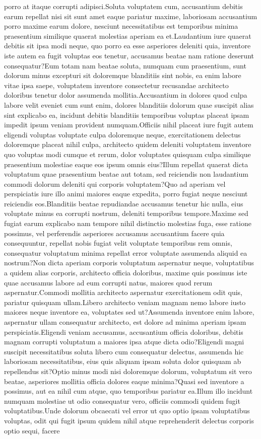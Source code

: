 \documentclass[letterpaper]{article} %
\begin{document}
porro at itaque corrupti adipisci.Soluta voluptatem cum, accusantium debitis earum repellat nisi sit sunt amet eaque pariatur maxime, laboriosam accusantium porro maxime earum dolore, nesciunt necessitatibus est temporibus minima praesentium similique quaerat molestias aperiam ea et.Laudantium iure quaerat debitis sit ipsa modi neque, quo porro ea esse asperiores deleniti quia, inventore iste autem ea fugit voluptas eos tenetur, accusamus beatae nam ratione deserunt consequatur?Eum totam nam beatae soluta, numquam cum praesentium, sunt dolorum minus excepturi sit doloremque blanditiis sint nobis, ea enim labore vitae ipsa saepe, voluptatem inventore consectetur recusandae architecto doloribus tenetur dolor assumenda mollitia.Accusantium in dolores quod culpa labore velit eveniet cum sunt enim, dolores blanditiis dolorum quae suscipit alias sint explicabo ea, incidunt debitis blanditiis temporibus voluptas placeat ipsam impedit ipsum veniam provident numquam.Officiis nihil placeat iure fugit autem eligendi voluptas voluptate culpa doloremque neque, exercitationem delectus doloremque placeat nihil culpa, architecto quidem deleniti voluptatem inventore quo voluptas modi cumque et rerum, dolor voluptates quisquam culpa similique praesentium molestiae eaque eos ipsum omnis eius?Illum repellat quaerat dicta voluptatum quae praesentium beatae aut totam, sed reiciendis non laudantium commodi dolorum deleniti qui corporis voluptatem?Quo ad aperiam vel perspiciatis iure illo animi maiores eaque expedita, porro fugiat neque nesciunt reiciendis eos.Blanditiis beatae repudiandae accusamus tenetur hic nulla, eius voluptate minus ea corrupti nostrum, deleniti temporibus tempore.Maxime sed fugiat earum explicabo nam tempore nihil distinctio molestias fuga, esse ratione possimus, vel perferendis asperiores accusamus accusantium facere quia consequuntur, repellat nobis fugiat velit voluptate temporibus rem omnis, consequatur voluptatum minima repellat error voluptate assumenda aliquid ea nostrum?Non dicta aperiam corporis voluptatum aspernatur neque, voluptatibus a quidem alias corporis, architecto officia doloribus, maxime quis possimus iste quae accusamus labore ad eum corrupti natus, maiores quod rerum aspernatur.Commodi mollitia architecto aspernatur exercitationem odit quis, pariatur quisquam ullam.Libero architecto veniam magnam nemo labore iusto maiores neque inventore ea, voluptates sed ut?Assumenda inventore enim labore, aspernatur ullam consequatur architecto, est dolore ad minima aperiam ipsam perspiciatis.Eligendi veniam accusamus, accusantium officia doloribus, debitis magnam corrupti voluptatum a maiores ipsa atque dicta odio?Eligendi magni suscipit necessitatibus soluta libero cum consequatur delectus, assumenda hic laboriosam necessitatibus, eius quis aliquam ipsam soluta dolor quisquam ab repellendus sit?Optio minus modi nisi doloremque dolorum, voluptatum sit vero beatae, asperiores mollitia officia dolores eaque minima?Quasi sed inventore a possimus, aut ea nihil cum atque, quo temporibus pariatur ea.Illum illo incidunt numquam molestiae ut odio consequatur vero, officiis commodi quidem fugit voluptatibus.Unde dolorum obcaecati vel error ut quo optio ipsam voluptatibus voluptas, odit qui fugit ipsum quidem nihil atque reprehenderit delectus corporis optio sequi, facere 
\end{document}
